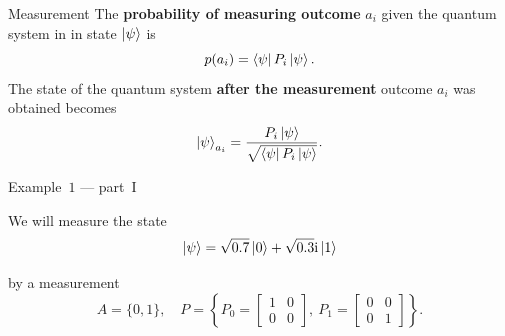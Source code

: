        \begin{frame}{Measurement}
            The \textbf{probability of measuring outcome} $a_i$ given the quantum 
            system in in state $\ket{\psi}$ is
            $$
            p(a_i)=\bra{\psi}P_i\ket{\psi}.
            $$
            The state of the quantum system \textbf{after the measurement} outcome 
            $a_i$ was obtained becomes
            $$
            \ket{\psi}_{a_i} = \frac{P_i\ket{\psi}}{\sqrt{\bra{\psi}P_i\ket{\psi}}}.
            $$
        \end{frame}
        \begin{frame}{Example~$1$ --- part~I}
            \begin{block}{We will measure the state}
                $$\ket\psi = \sqrt{0.7} \ket{0} + \sqrt{0.3} \mathrm{i} \ket{1} $$
            \end{block}
            \begin{block}{by a measurement}
                \begin{equation*}
                    A = \{0,1\}, \quad  P = \left\{P_0  = 
                    \begin{bmatrix}
                        1 & 0\\
                        0 & 0
                    \end{bmatrix}, \ 
                    P_1 = 
                    \begin{bmatrix}
                        0 & 0\\
                        0 & 1
                    \end{bmatrix}\right\}.
                \end{equation*}
            \end{block}
            

\end{frame}
